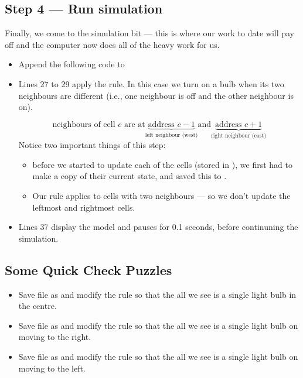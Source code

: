 \documentclass{coderdojo}
\newcommand\TODO[1]{
\begin{itemize}
\item[\todoSymbol] \color{todo} #1
\end{itemize}}
\begin{document}
\subsection{Step 4 --- Run simulation}

Finally, we come to the simulation bit --- this is where our work to date will pay off and the computer now does all of the heavy work for us. 

\TODO{Append the following code to }


\begin{itemize}
\item
Lines 27 to 29 apply the rule. In this case we turn on a bulb when its two neighbours are different (i.e., one neighbour is off and the other neighbour is on).

\[
	\text{neighbours of cell $c$ are at}
	\underbrace{\text{address $c-1$}}_{\text{left neighbour (west)}}
	\text{and}
	\underbrace{\text{address $c+1$}}_{\text{right neighbour (east)}}
\]
Notice two important things of this step:
\begin{itemize}
\item
before we started to update each of the cells (stored in ), we first had to make a copy of their current state, and saved this to .
\item
Our rule applies to cells with two neighbours --- so we don't update the leftmost and rightmost cells. 
\end{itemize}
\item
Lines 37 display the model and pauses for 0.1 seconds, before continuning the simulation.
\end{itemize}

\subsection*{Some Quick Check Puzzles}

\TODO{Save file as  and modify the rule so that the all we see is a single light bulb in the centre.}

\TODO{Save file as  and modify the rule so that the all we see is a single light bulb on moving to the right.}

\TODO{Save file as  and modify the rule so that the all we see is a single light bulb on moving to the left.}
\end{document}
